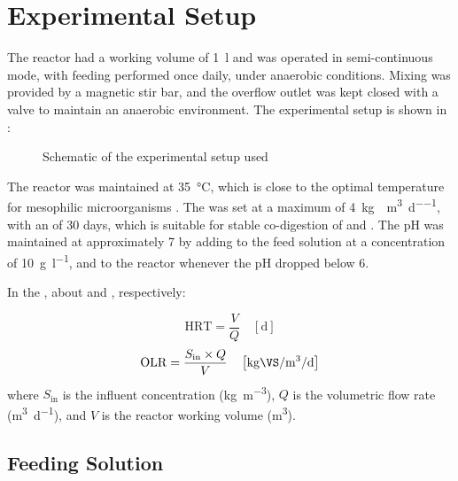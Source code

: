 \section{Experimental Setup}
\label{sec:experiment_configuration}

The reactor had a working volume of \qty{1}{\litre} and was operated in semi-continuous mode, with feeding performed once daily, under anaerobic conditions. Mixing was provided by a magnetic stir bar, and the overflow outlet was kept closed with a valve to maintain an anaerobic environment. The experimental setup is shown in :

\begin{figure}[H]
    \centering
    \resizebox{\textwidth}{!}{%
        
    }
    \caption{Schematic of the experimental setup used}
    \label{graph:reactor}
\end{figure}

The reactor was maintained at \qty{35}{\celsius}, which is close to the optimal temperature for mesophilic microorganisms \parencite{choorit2007}. The  was set at a maximum of \qty{4}{\kilo\gram\VS\per\cubic\metre\per\day}, with an  of \num{30} days, which is suitable for stable co-digestion of  and  \parencite{tomczak2025}. The pH was maintained at approximately \num{7} by adding  to the feed solution at a concentration of \qty{10}{\gram\per\litre}, and to the reactor whenever the pH dropped below \num[round-mode = places, round-precision = 1]{6}.

In the , about  and , respectively:

\begin{equation}
    \mathrm{HRT} = \frac{V}{Q} \quad \left[\unit{\day}\right]
    \label{eq:HRT}
\end{equation}
\begin{equation}
    \mathrm{OLR} = \frac{S_{\text{in}} \times Q}{V} \quad \left[\unit{\kilo\gram\VS\per\cubic\meter\per\day}\right]
    \label{eq:OLR}
\end{equation}
where $S_{\text{in}}$ is the influent \unit{\VS} concentration (\unit{\kilo\gram\per\cubic\metre}), $Q$ is the volumetric flow rate (\unit{\cubic\metre\per\day}), and $V$ is the reactor working volume (\unit{\cubic\metre}).

\subsection{Feeding Solution}
\label{subsec:feeding_solution}

